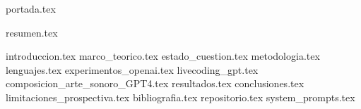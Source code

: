 \documentclass[a4paper,openany,oneside,12pt]{report}
\begin{document}
  {portada.tex}
  \setcounter{page}{2} %

  {resumen.tex}
  \clearpage

  \tableofcontents
  \clearpage
  \listoffigures 
  \clearpage
  \listoftables
  \clearpage


  {introduccion.tex}
  {marco_teorico.tex}
  {estado_cuestion.tex}
  {metodologia.tex}
  {lenguajes.tex}
  {experimentos_openai.tex}
  {livecoding_gpt.tex}
  {composicion_arte_sonoro_GPT4.tex}
  {resultados.tex}
  {conclusiones.tex}
  {limitaciones_prospectiva.tex}
  {bibliografia.tex}
  {repositorio.tex}
  {system_prompts.tex}


  \printindex %
  \clearpage
\end{document}

